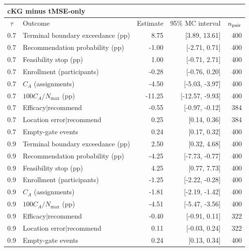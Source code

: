 \begin{tabular}{@{}clrrr@{}}
\multicolumn{5}{l}{\textbf{cKG minus tMSE-only}} \\
\toprule
$\tau$ & Outcome & Estimate & 95\% MC interval & $n_{\rm pair}$ \\
\midrule
0.7 & Terminal boundary exceedance (pp) & 8.75 & [3.89, 13.61] & 400 \\
0.7 & Recommendation probability (pp) & -1.00 & [-2.71, 0.71] & 400 \\
0.7 & Feasibility stop (pp) & 1.00 & [-0.71, 2.71] & 400 \\
0.7 & Enrollment (participants) & -0.28 & [-0.76, 0.20] & 400 \\
0.7 & $C_A$ (assignments) & -4.50 & [-5.03, -3.97] & 400 \\
0.7 & $100C_A/N_{\max}$ (pp) & -11.25 & [-12.57, -9.93] & 400 \\
0.7 & Efficacy$\mid$recommend & -0.55 & [-0.97, -0.12] & 384 \\
0.7 & Location error$\mid$recommend & 0.25 & [0.14, 0.36] & 384 \\
0.7 & Empty-gate events & 0.24 & [0.17, 0.32] & 400 \\
0.9 & Terminal boundary exceedance (pp) & 2.50 & [0.32, 4.68] & 400 \\
0.9 & Recommendation probability (pp) & -4.25 & [-7.73, -0.77] & 400 \\
0.9 & Feasibility stop (pp) & 4.25 & [0.77, 7.73] & 400 \\
0.9 & Enrollment (participants) & -1.25 & [-2.22, -0.28] & 400 \\
0.9 & $C_A$ (assignments) & -1.81 & [-2.19, -1.42] & 400 \\
0.9 & $100C_A/N_{\max}$ (pp) & -4.51 & [-5.47, -3.56] & 400 \\
0.9 & Efficacy$\mid$recommend & -0.40 & [-0.91, 0.11] & 322 \\
0.9 & Location error$\mid$recommend & 0.11 & [-0.03, 0.24] & 322 \\
0.9 & Empty-gate events & 0.24 & [0.13, 0.34] & 400 \\
\bottomrule
\end{tabular}
\smallskip

\medskip

